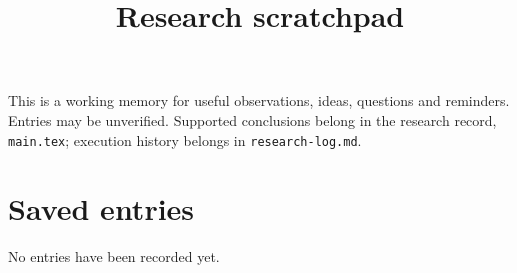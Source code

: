 \documentclass[11pt]{article}
\title{Research scratchpad}
\author{}
\date{}
\begin{document}
\maketitle

This is a working memory for useful observations, ideas, questions and reminders.
Entries may be unverified. Supported conclusions belong in the research record,
\texttt{main.tex}; execution history belongs in \texttt{research-log.md}.

\section*{Saved entries}
No entries have been recorded yet.

\end{document}
